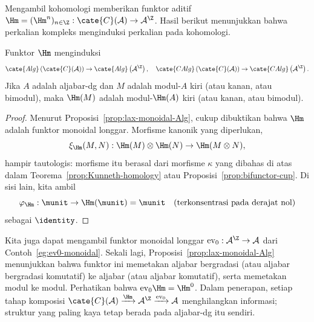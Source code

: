 Mengambil kohomologi memberikan funktor aditif
$\Hm=(\Hm^n)_{n\in\Z}:\cate{C}(\mathcal{A})\to\mathcal{A}^{\Z}$. Hasil
berikut menunjukkan bahwa perkalian kompleks menginduksi perkalian pada
kohomologi.

\begin{proposition}\label{prop:Hm-lax-monoidal}
	Funktor $\Hm$ menginduksi
	\[ \cate{Alg}\left(\cate{C}(\mathcal{A})\right) \to \cate{Alg}\left(\mathcal{A}^{\Z}\right),
	\quad \cate{CAlg}\left(\cate{C}(\mathcal{A})\right) \to \cate{CAlg}\left(\mathcal{A}^{\Z}\right). \]
	Jika $A$ adalah aljabar-dg dan $M$ adalah modul-$A$ kiri (atau kanan, atau
	bimodul), maka $\Hm(M)$ adalah modul-$\Hm(A)$ kiri (atau kanan, atau
	bimodul).
\end{proposition}
\begin{proof}
	Menurut Proposisi~\ref{prop:lax-monoidal-Alg}, cukup dibuktikan bahwa $\Hm$
	adalah funktor monoidal longgar. Morfisme kanonik yang diperlukan,
	\[ \xi_{\Hm}(M, N): \Hm(M) \otimes \Hm(N) \to \Hm(M \otimes N), \]
	hampir tautologis: morfisme itu berasal dari morfisme $\kappa$ yang dibahas
	di atas dalam Teorema~\ref{prop:Kunneth-homology} atau
	Proposisi~\ref{prop:bifunctor-cup}. Di sisi lain, kita ambil
	\[ \varphi_{\Hm}: \munit \to \Hm(\munit) = \munit \quad \text{(terkonsentrasi pada derajat nol)} \]
	sebagai $\identity$.
\end{proof}

Kita juga dapat mengambil funktor monoidal longgar
$\mathrm{ev}_0:\mathcal{A}^{\Z}\to\mathcal{A}$ dari
Contoh~\ref{eg:ev0-monoidal}. Sekali lagi,
Proposisi~\ref{prop:lax-monoidal-Alg} menunjukkan bahwa funktor ini memetakan
aljabar bergradasi (atau aljabar bergradasi komutatif) ke aljabar (atau
aljabar komutatif), serta memetakan modul ke modul. Perhatikan bahwa
$\mathrm{ev}_0\Hm=\Hm^0$. Dalam penerapan, setiap tahap komposisi
$\cate{C}(\mathcal{A})\xrightarrow{\Hm}\mathcal{A}^{\Z}
\xrightarrow{\mathrm{ev}_0}\mathcal{A}$ menghilangkan informasi; struktur
yang paling kaya tetap berada pada aljabar-dg itu sendiri.

